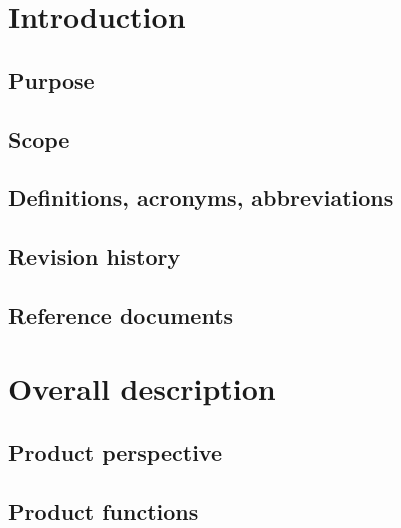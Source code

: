 \documentclass[10pt,english, openany]{book}
\begin{document}
\chapter{Introduction}\label{chapt:sum}

\section{Purpose}



\section{Scope}



\section{Definitions, acronyms, abbreviations}



\section{Revision history}



\section{Reference documents}



\chapter{Overall description}

\section{Product perspective}



\section{Product functions}
\end{document}
